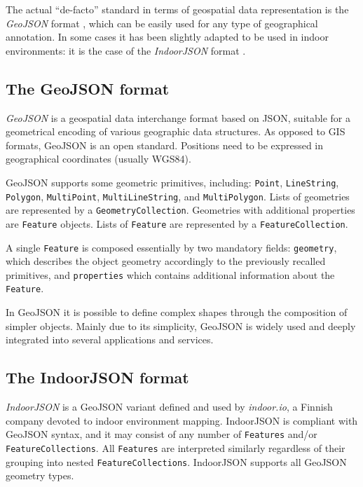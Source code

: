 The actual ``de-facto'' standard in terms of geospatial data representation is
the \emph{GeoJSON} format \cite{geojson}, which can be easily used for any type of geographical
annotation. In some cases it has been slightly adapted to be used in indoor
environments: it is the case of the \emph{IndoorJSON} format \cite{indoorjson}.

\subsection{The GeoJSON format}\label{the-geojson-format}

\emph{GeoJSON} is a geospatial data interchange format based on JSON, suitable for a
geometrical encoding of various geographic data structures. As opposed to GIS
formats, GeoJSON is an open standard. Positions need to be expressed in
geographical coordinates (usually WGS84).

GeoJSON supports some geometric primitives, including: {\tt Point},
{\tt Line\-String}, {\tt Polygon}, {\tt MultiPoint},
{\tt MultiLineString}, and {\tt MultiPolygon}. Lists of geometries are
represented by a {\tt GeometryCollection}. Geometries with additional
properties are {\tt Feature} objects. Lists of {\tt Feature} are
represented by a {\tt FeatureCollection}.

A single {\tt Feature} is composed essentially by two mandatory fields:
{\tt geometry}, which describes the object geometry accordingly to the
previously recalled primitives, and {\tt properties} which contains
additional information about the {\tt Feature}.

In GeoJSON it is possible to define complex shapes through the composition of simpler
 objects. Mainly due to its simplicity, GeoJSON is widely used and
deeply integrated into several applications and services.

\subsection{The IndoorJSON format}\label{experiences-on-indoor-json}

\emph{IndoorJSON} is a GeoJSON variant defined and used by \emph{indoor.io}, a
Finnish company devoted to indoor environment mapping. IndoorJSON is compliant
with GeoJSON syntax, and it may consist of any number of {\tt Features}
and/or {\tt FeatureCollections}. All {\tt Features} are interpreted
similarly regardless of their grouping into nested
{\tt FeatureCollections}. IndoorJSON supports all GeoJSON geometry types.

